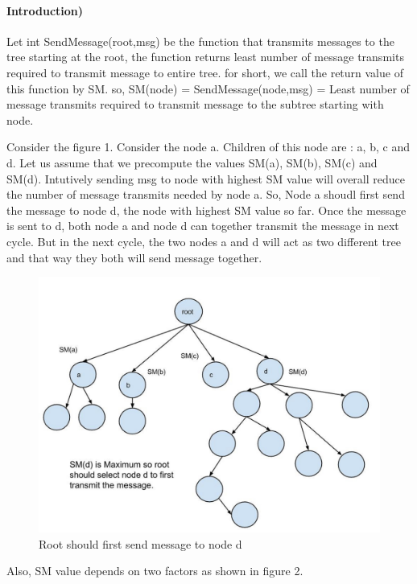 \paragraph{Introduction)} 
Let int  SendMessage(root,msg) be the function that transmits messages to the tree starting at the root, the function returns least number of message transmits required to transmit message to entire tree. 
for short, we call the return value of this function by SM. 
so, SM(node) = SendMessage(node,msg) = Least number of message transmits required to transmit message to the subtree starting with node. 

Consider the figure 1. Consider the node a. Children of this node are : a, b, c and d. Let us assume that we precompute the values SM(a), SM(b), SM(c) and SM(d). Intutively sending msg to node with highest SM value will overall reduce the number of message transmits needed by node a. So, Node a shoudl first send the message to node d, the node with highest SM value so far. Once the message is sent to d,  both node a and node d can together transmit the message in next cycle. But in the next cycle, the two nodes a and d will act as two different tree and that way they both will send message together.

\begin{figure}[4a]
    \centering
    \includegraphics[scale=0.10]{4a}
    \caption{Root should first send message to node d}
\end{figure}


Also, SM value depends on two factors as shown in figure 2. 

